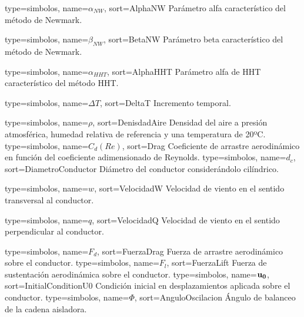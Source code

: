 {
	type={simbolos},
	name={$\alpha_{NW}$}, %
	sort={AlphaNW} %
}
{Parámetro alfa característico del método de Newmark.}

{
	type={simbolos},
	name={$\beta_{NW}$}, %
	sort={BetaNW} %
}
{Parámetro beta característico del método de Newmark.}

{
	type={simbolos},
	name={$\alpha_{HHT}$}, %
	sort={AlphaHHT} %
}
{Parámetro alfa de HHT característico del método HHT.}

{
	type={simbolos},
	name={$\Delta T$}, %
	sort={DeltaT} %
}
{Incremento temporal.}

{
	type={simbolos},
	name={$\rho$}, %
	sort={DenisdadAire} %
}
{Densidad del aire a presión atmosférica, humedad relativa de referencia y una temperatura de 20ºC.}
{
	type={simbolos},
	name={$C_d(Re)$}, %
	sort={Drag} %
}
{Coeficiente de arrastre aerodinámico en función del coeficiente adimensionado de Reynolds.}
{
	type={simbolos},
	name={$d_c$}, %
	sort={DiametroConductor} %
}
{Diámetro del conductor considerándolo cilíndrico.}

{
	type={simbolos},
	name={$w$}, %
	sort={VelocidadW} %
}
{Velocidad de viento en el sentido transversal al conductor.}

{
	type={simbolos},
	name={$q$}, %
	sort={VelocidadQ} %
}
{Velocidad de viento en el sentido perpendicular al conductor.}

{
	type={simbolos},
	name={$F_d$}, %
	sort={FuerzaDrag} %
}
{Fuerza de arrastre aerodinámico sobre el conductor.}
{
	type={simbolos},
	name={$F_l$}, %
	sort={FuerzaLift} %
}
{Fuerza de sustentación aerodinámica sobre el conductor.}
{
	type={simbolos},
	name={$\bf{u}_0$}, %
	sort={InitialConditionU0} %
}
{Condición inicial en desplazamientos aplicada sobre el conductor.}
{
	type={simbolos},
	name={$\Phi$}, %
	sort={AnguloOscilacion} %
}
{Ángulo de balanceo de la cadena aisladora.}
